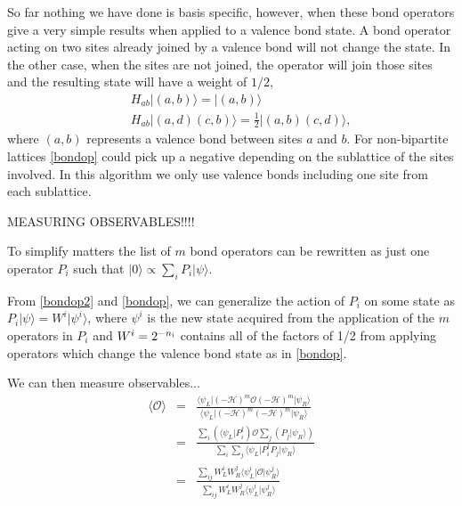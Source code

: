 \documentclass[prb,aps,twocolumn,floatfix,amsmath,amssymb,superscriptaddress,tightenlines]{revtex4}
\begin{document}
So far nothing we have done is basis specific, however, when these bond operators give a very simple results when applied to a valence bond state.  A bond operator acting on two sites already joined by a valence bond will not change the state.  In the other case, when the sites are not joined, the operator will join those sites and the resulting state will have a weight of $1/2$,
\begin{eqnarray}
	&&H_{ab}\lvert (a,b) \rangle=  \lvert (a,b) \rangle \label{bondop2}\\ 
	&&H_{ab}\lvert (a,d)(c,b) \rangle =  \tfrac{1}{2}\lvert (a,b)(c,d) \rangle, \label{bondop}
\end{eqnarray}
where $(a,b)$ represents a valence bond between sites $a$ and $b$.  
For non-bipartite lattices \eqref{bondop} could pick up a negative depending on the sublattice of the sites involved.  In this algorithm we only use valence bonds including one site from each sublattice.

MEASURING OBSERVABLES!!!!  

To simplify matters the list of $m$ bond operators can be rewritten as just one operator $P_i$ such that $\lvert 0 \rangle \propto \sum_i P_i \lvert \psi\rangle$.

From \eqref{bondop2} and \eqref{bondop}, we can generalize the action of $P_i$ on some state as $P_i \lvert \psi\rangle = W^i  \lvert \psi^i\rangle$, where $ \psi^i$ is the new state acquired from the application of the $m$ operators in $P_i$ and $W^i = 2^{-n_{\rm i}}$ contains all of the factors of 1/2 from applying operators which change the valence bond state as in \eqref{bondop}.

We can then measure observables...
\begin{eqnarray}
\langle \mathcal{O}\rangle  &=& \frac{ \langle \psi_L \rvert (-\mathcal{H})^m\mathcal{O}(-\mathcal{H})^m \lvert \psi_R \rangle}{ \langle \psi_L \rvert (-\mathcal{H})^m(-\mathcal{H})^m \lvert \psi_R \rangle}  \label{measure}\\
&=& \frac{\sum_i (\langle \psi_L \rvert P_i^{\dagger})\mathcal{O}\sum_j(P_j \lvert \psi_R \rangle)}{\sum_i\sum_j \langle \psi_L \rvert P_i^{\dagger}P_j \lvert \psi_R \rangle} \\
&=&  \frac{\sum_{ij} W_L^iW_R^j\langle \psi_L^i \rvert \mathcal{O}\lvert \psi_R^j \rangle}{\sum_{ij} W_L^iW_R^j\langle \psi_L^i \rvert \psi_R^j \rangle} 
\end{eqnarray}
\end{document}
